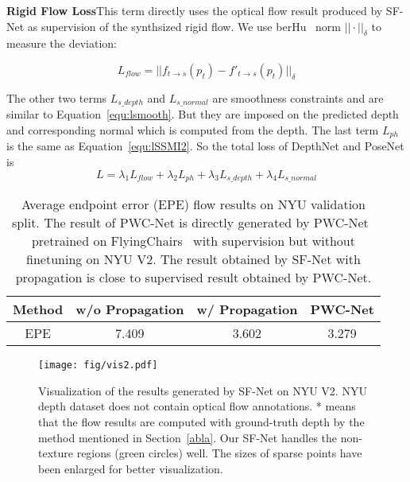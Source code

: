 \documentclass[10pt,twocolumn,letterpaper]{article}
\begin{document}
\textbf{Rigid Flow Loss}\quad This term directly uses the optical flow result produced by SF-Net as supervision of the synthsized rigid flow. We use berHu~\cite{laina2016deeper} norm $||\cdot||_{\delta}$ to measure the deviation:

\begin{equation}
    L_{flow} = ||f_{t\xrightarrow{}s}(p_t) - f'_{t\xrightarrow{}s}(p_t)||_{\delta}
\end{equation}



The other two terms $L_{s\_depth}$ and $L_{s\_normal}$ are smoothness constraints and are similar to Equation~\ref{equ:lsmooth}. But they are imposed on the predicted depth and corresponding normal which is computed from the depth. The last term $L_{ph}$ is the same as Equation~\ref{equ:lSSMI2}. So the total loss of DepthNet and PoseNet is
\begin{equation}
    L=\lambda_{1}L_{flow} + \lambda_{2}L_{ph}+\lambda_{3}L_{s\_depth}+\lambda_{4}L_{s\_normal}
\end{equation}


\begin{table}[htbp]
\vspace{-3mm}
\renewcommand\tabcolsep{4pt}
  \centering
    \begin{tabular}{cccc}
    \toprule
    Method & w/o Propagation & w/ Propagation  & PWC-Net \\
    \midrule
    EPE   & 7.409 & 3.602  & 3.279 \\
    \bottomrule
    \end{tabular}\vspace{2mm}
  \caption{\label{tab:sa_region} Average endpoint error (EPE) flow results on NYU validation split. The result of PWC-Net is directly generated by PWC-Net~\cite{Sun2018PWC-Net} pretrained on FlyingChairs~\cite{DFIB15} with supervision but without finetuning on NYU V2. The result obtained by SF-Net with propagation is close to supervised result obtained by PWC-Net.}
  \vspace{-2mm}
\end{table}

\begin{figure*}
\begin{center}
  \texttt{[image: fig/vis2.pdf]}
\end{center}
   \vspace{-3mm}
   \caption{Visualization of the results generated by SF-Net on NYU V2. NYU depth dataset does not contain optical flow annotations. * means that the flow results are computed with ground-truth depth by the method mentioned in Section~\ref{abla}. Our SF-Net handles the non-texture regions (green circles) well. The sizes of sparse points have been enlarged for better visualization.}
\label{fig:kitti_quqa}
\vspace{-3mm}
\end{figure*}
\end{document}
